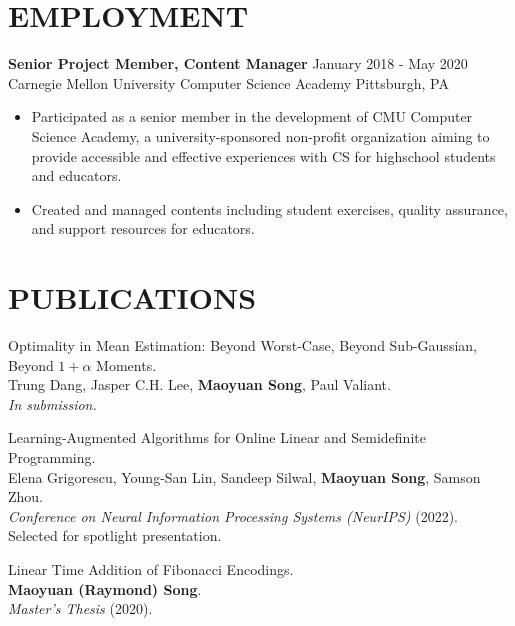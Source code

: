 \documentclass[margin, 10pt]{res} %
\begin{document}
\begin{resume}
\section{EMPLOYMENT}

{\bf Senior Project Member, Content Manager} \hfill January 2018 - May 2020 \\
Carnegie Mellon University Computer Science Academy \hfill Pittsburgh, PA

\begin{itemize}
\item Participated as a senior member in the development of CMU Computer Science Academy, a university-sponsored non-profit organization aiming to provide accessible and effective experiences with CS for highschool students and educators.
\item Created and managed contents including student exercises, quality assurance, and support resources for educators.
\end{itemize} 


\section{PUBLICATIONS}
\begin{etaremune}
\item Optimality in Mean Estimation: Beyond Worst-Case, Beyond Sub-Gaussian, Beyond $1 + \alpha$ Moments.\\
Trung Dang, Jasper C.H. Lee, {\bf Maoyuan Song}, Paul Valiant.\\
\emph{In submission.}
\item Learning-Augmented Algorithms for Online Linear and Semidefinite Programming.\\
Elena Grigorescu, Young-San Lin, Sandeep Silwal, {\bf Maoyuan Song}, Samson Zhou.\\
\emph{Conference on Neural Information Processing Systems (NeurIPS)} (2022). Selected for spotlight presentation.
\item Linear Time Addition of Fibonacci Encodings.\\
{\bf Maoyuan (Raymond) Song}.\\
\emph{Master's Thesis} (2020). 
\end{etaremune}



\end{resume}
\end{document}
